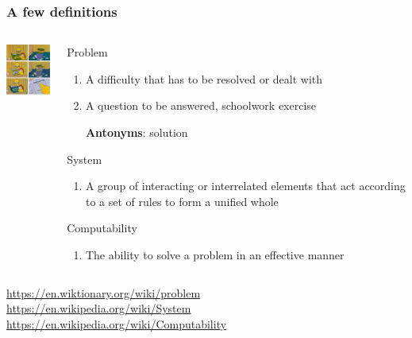 \documentclass[xcolor=x11names,handout]{beamer}
\newcommand{\light}[1]{\textcolor{gray}{#1}}
\begin{document}
\begin{frame}
\frametitle{A few definitions}
\begin{columns}
\begin{column}{0.2\textwidth}
 \includegraphics[width=23mm]{img/homer_marketing.png}
\end{column}												\pause

\begin{column}{0.8\textwidth}

\alert{Problem}
\begin{enumerate}
 \item A difficulty that has to be resolved or dealt with
 \item A question to be answered, schoolwork exercise	\pause

	\textbf{Antonyms}: solution
\end{enumerate}											\pause

\alert{System}
\begin{enumerate}
 \item A group of interacting or interrelated elements that act according to a
set of rules to form a unified whole
\end{enumerate}											\pause

\alert{Computability}
\begin{enumerate}
 \item The ability to solve a problem in an effective manner
\end{enumerate}

\end{column}
\end{columns}
\bigskip

\onslide
\footnotesize
\light{%
\url{https://en.wiktionary.org/wiki/problem}	\\
\url{https://en.wikipedia.org/wiki/System}	\\
\url{https://en.wikipedia.org/wiki/Computability}
}
\end{frame}
\end{document}
